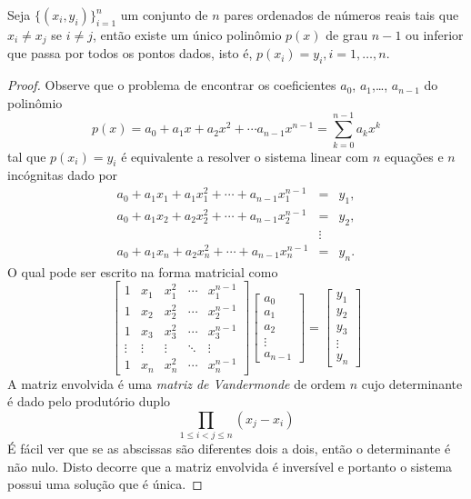 \begin{teo}\label{teo:interp_poli} Seja $\{(x_i,y_i)\}_{i=1}^{n}$ um conjunto de $n$ pares ordenados de números reais tais que $x_i \ne x_j$ se $i\ne j$, então existe um único polinômio $p(x)$ de grau $n-1$ ou inferior que passa por todos os pontos dados, isto é, $p(x_i)=y_i, i=1,\ldots, n$.
\end{teo}
\begin{proof} Observe que o problema de encontrar os coeficientes $a_0$, $a_1$,\ldots, $a_{n-1}$ do polinômio
$$p(x)=a_0+a_1x+a_2x^2+\cdots a_{n-1}x^{n-1}=\sum_{k=0}^{n-1} a_k x^k$$
tal que $p(x_i)=y_i$ é equivalente a resolver o sistema linear com $n$ equações e $n$ incógnitas dado por
\begin{eqnarray*}
a_0+a_1x_1+a_1x_1^2+\cdots +a_{n-1} x_1^{n-1}&=&y_1,\\
a_0+a_1x_2+a_2x_2^2+\cdots +a_{n-1} x_2^{n-1}&=&y_2,\\
&\vdots&\\
a_0+a_1x_n+a_2x_n^2+\cdots +a_{n-1} x_n^{n-1}&=&y_n.
\end{eqnarray*}
O qual pode ser escrito na forma matricial como
$$\begin{bmatrix}
1 & x_1 & x_1^2 & \cdots & x_1^{n-1}\\
1 & x_2 & x_2^2 & \cdots & x_2^{n-1}\\
1 & x_3 & x_3^2 & \cdots & x_3^{n-1}\\
\vdots&\vdots&\vdots&\ddots&\vdots\\
1 & x_n & x_n^2 & \cdots & x_n^{n-1}
\end{bmatrix}
\begin{bmatrix}
a_0\\a_1\\a_2\\ \vdots \\a_{n-1}
\end{bmatrix}=
\begin{bmatrix}
y_1\\y_2\\y_3\\ \vdots \\y_n
\end{bmatrix}
$$
A matriz envolvida é uma \emph{matriz de Vandermonde} de ordem $n$ cujo determinante é dado pelo produtório duplo
$$\prod_{1\leq i<j\leq n}\left(x_j-x_i\right)$$
É fácil ver que se as abscissas são diferentes dois a dois, então o determinante é não nulo. Disto decorre que a matriz envolvida é inversível e portanto o sistema possui uma solução que é única.
\end{proof}

